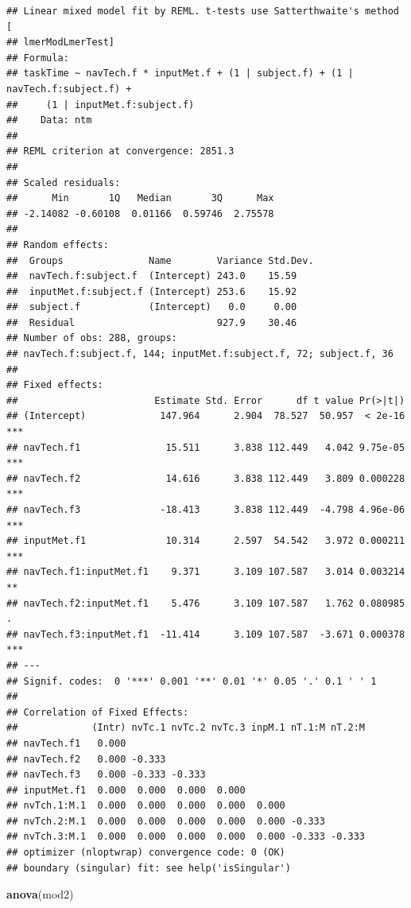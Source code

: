 \documentclass[
]{book}
\newenvironment{Shaded}{\begin{snugshade}}{\end{snugshade}}
\newcommand{\FunctionTok}[1]{\textcolor[rgb]{0.13,0.29,0.53}{\textbf{#1}}}
\newcommand{\NormalTok}[1]{#1}
\begin{document}
\begin{verbatim}
## Linear mixed model fit by REML. t-tests use Satterthwaite's method [
## lmerModLmerTest]
## Formula: 
## taskTime ~ navTech.f * inputMet.f + (1 | subject.f) + (1 | navTech.f:subject.f) +  
##     (1 | inputMet.f:subject.f)
##    Data: ntm
## 
## REML criterion at convergence: 2851.3
## 
## Scaled residuals: 
##      Min       1Q   Median       3Q      Max 
## -2.14082 -0.60108  0.01166  0.59746  2.75578 
## 
## Random effects:
##  Groups               Name        Variance Std.Dev.
##  navTech.f:subject.f  (Intercept) 243.0    15.59   
##  inputMet.f:subject.f (Intercept) 253.6    15.92   
##  subject.f            (Intercept)   0.0     0.00   
##  Residual                         927.9    30.46   
## Number of obs: 288, groups:  
## navTech.f:subject.f, 144; inputMet.f:subject.f, 72; subject.f, 36
## 
## Fixed effects:
##                        Estimate Std. Error      df t value Pr(>|t|)    
## (Intercept)             147.964      2.904  78.527  50.957  < 2e-16 ***
## navTech.f1               15.511      3.838 112.449   4.042 9.75e-05 ***
## navTech.f2               14.616      3.838 112.449   3.809 0.000228 ***
## navTech.f3              -18.413      3.838 112.449  -4.798 4.96e-06 ***
## inputMet.f1              10.314      2.597  54.542   3.972 0.000211 ***
## navTech.f1:inputMet.f1    9.371      3.109 107.587   3.014 0.003214 ** 
## navTech.f2:inputMet.f1    5.476      3.109 107.587   1.762 0.080985 .  
## navTech.f3:inputMet.f1  -11.414      3.109 107.587  -3.671 0.000378 ***
## ---
## Signif. codes:  0 '***' 0.001 '**' 0.01 '*' 0.05 '.' 0.1 ' ' 1
## 
## Correlation of Fixed Effects:
##             (Intr) nvTc.1 nvTc.2 nvTc.3 inpM.1 nT.1:M nT.2:M
## navTech.f1   0.000                                          
## navTech.f2   0.000 -0.333                                   
## navTech.f3   0.000 -0.333 -0.333                            
## inputMet.f1  0.000  0.000  0.000  0.000                     
## nvTch.1:M.1  0.000  0.000  0.000  0.000  0.000              
## nvTch.2:M.1  0.000  0.000  0.000  0.000  0.000 -0.333       
## nvTch.3:M.1  0.000  0.000  0.000  0.000  0.000 -0.333 -0.333
## optimizer (nloptwrap) convergence code: 0 (OK)
## boundary (singular) fit: see help('isSingular')
\end{verbatim}

\begin{Shaded}
\begin{Highlighting}[]
\FunctionTok{anova}\NormalTok{(mod2)}
\end{Highlighting}
\end{Shaded}
\end{document}
